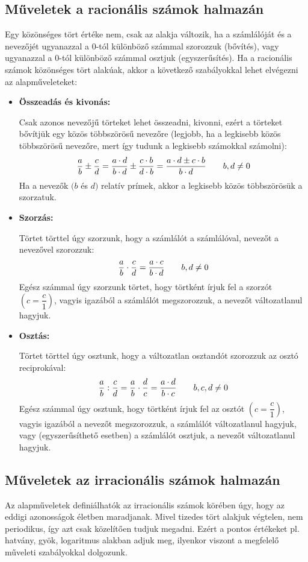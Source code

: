\documentclass[12pt,a4paper]{article}
\begin{document}
\subsection{Műveletek a racionális számok halmazán}
Egy közönséges tört értéke nem, csak az alakja változik, ha a számlálóját és a nevezőjét ugyanazzal a 0-tól különböző számmal szorozzuk (bővítés), vagy ugyanazzal a 0-tól különböző számmal osztjuk (egyszerűsítés).
Ha a racionális számok közönséges tört alakúak, akkor a következő szabályokkal lehet elvégezni az alapműveleteket:
\begin{itemize}
\item \textbf{Összeadás és kivonás:}

Csak azonos nevezőjű törteket lehet összeadni, kivonni, ezért a törteket bővítjük egy közös többszörösű nevezőre (legjobb, ha a legkisebb közös többszörösű nevezőre, mert így tudunk a legkisebb számokkal számolni):
$$\dfrac{a}{b}\pm\dfrac{c}{d}=\dfrac{a\cdot d}{b\cdot d}\pm\dfrac{c\cdot b}{d\cdot b}=\dfrac{a\cdot d \pm c\cdot b}{b\cdot d}\hspace{20px} b,d\neq 0$$
Ha a nevezők $(b$ és $d)$ relatív prímek, akkor a legkisebb közös többszörösük a szorzatuk.
\item \textbf{Szorzás:}

Törtet törttel úgy szorzunk, hogy a számlálót a számlálóval, nevezőt a nevezővel szorozzuk:
$$\dfrac{a}{b}\cdot\dfrac{c}{d}=\dfrac{a\cdot c}{b\cdot d}\hspace{20px} b,d\neq 0$$
Egész számmal úgy szorzunk törtet, hogy törtként írjuk fel a szorzót $\left(c=\dfrac{c}{1} \right)$, vagyis igazából a számlálót megszorozzuk, a nevezőt változatlanul hagyjuk.
\item \textbf{Osztás:}

Törtet törttel úgy osztunk, hogy a változatlan osztandót szorozzuk az osztó reciprokával:
$$\dfrac{a}{b}:\dfrac{c}{d}=\dfrac{a}{b}\cdot\dfrac{d}{c}=\dfrac{a\cdot d}{b\cdot c}\hspace{20px} b,c,d\neq 0$$
Egész számmal úgy osztunk, hogy törtként írjuk fel az osztót $\left(c=\dfrac{c}{1} \right)$, vagyis igazából a nevezőt megszorozzuk, a számlálót változatlanul hagyjuk, vagy (egyszerűsíthető esetben) a számlálót osztjuk, a nevezőt változatlanul hagyjuk.
\end{itemize}
\newpage
\subsection{Műveletek az irracionális számok halmazán}
Az alapműveletek definiálhatók az irracionális számok körében úgy, hogy az eddigi azonosságok életben maradjanak. Mivel tizedes tört alakjuk végtelen, nem periodikus, így azt csak közelítően tudjuk megadni. Ezért a pontos értékeket pl. hatvány, gyök, logaritmus alakban adjuk meg, ilyenkor viszont a megfelelő műveleti szabályokkal dolgozunk.
\end{document}
